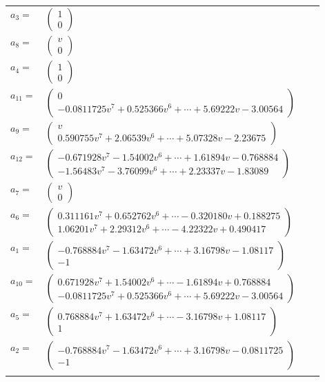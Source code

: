 \documentclass[1p]{elsarticle_modified}
\theoremstyle{definition}
\begin{document}
\begin{tabular}{m{7pt} m{180pt} m{7pt} m{180pt} }
\flushright $a_{3}=$&$\begin{pmatrix}1\\0\end{pmatrix}$ \\
\flushright $a_{8}=$&$\begin{pmatrix}v\\0\end{pmatrix}$ \\
\flushright $a_{4}=$&$\begin{pmatrix}1\\0\end{pmatrix}$ \\
\flushright $a_{11}=$&$\begin{pmatrix}0\\-0.0811725 v^{7}+0.525366 v^{6}+\cdots+5.69222 v-3.00564\end{pmatrix}$ \\
\flushright $a_{9}=$&$\begin{pmatrix}v\\0.590755 v^{7}+2.06539 v^{6}+\cdots+5.07328 v-2.23675\end{pmatrix}$ \\
\flushright $a_{12}=$&$\begin{pmatrix}-0.671928 v^{7}-1.54002 v^{6}+\cdots+1.61894 v-0.768884\\-1.56483 v^{7}-3.76099 v^{6}+\cdots+2.23337 v-1.83089\end{pmatrix}$ \\
\flushright $a_{7}=$&$\begin{pmatrix}v\\0\end{pmatrix}$ \\
\flushright $a_{6}=$&$\begin{pmatrix}0.311161 v^{7}+0.652762 v^{6}+\cdots-0.320180 v+0.188275\\1.06201 v^{7}+2.29312 v^{6}+\cdots-4.22322 v+0.490417\end{pmatrix}$ \\
\flushright $a_{1}=$&$\begin{pmatrix}-0.768884 v^{7}-1.63472 v^{6}+\cdots+3.16798 v-1.08117\\-1\end{pmatrix}$ \\
\flushright $a_{10}=$&$\begin{pmatrix}0.671928 v^{7}+1.54002 v^{6}+\cdots-1.61894 v+0.768884\\-0.0811725 v^{7}+0.525366 v^{6}+\cdots+5.69222 v-3.00564\end{pmatrix}$ \\
\flushright $a_{5}=$&$\begin{pmatrix}0.768884 v^{7}+1.63472 v^{6}+\cdots-3.16798 v+1.08117\\1\end{pmatrix}$ \\
\flushright $a_{2}=$&$\begin{pmatrix}-0.768884 v^{7}-1.63472 v^{6}+\cdots+3.16798 v-0.0811725\\-1\end{pmatrix}$\\&\end{tabular}
\end{document}
